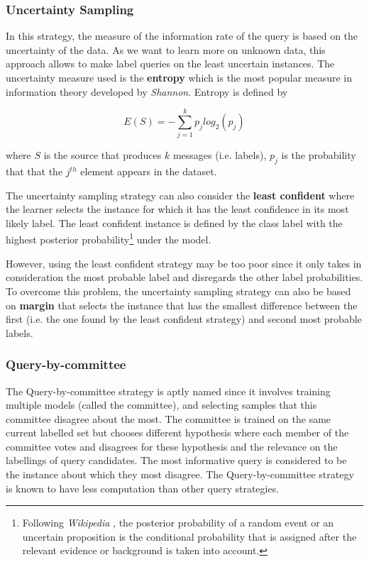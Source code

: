 \documentclass[11pt, openany]{report}
\theoremstyle{plain}
\theoremstyle{definition}
\theoremstyle{remark}
\begin{document}
\subsubsection{Uncertainty Sampling}
In this strategy, the measure of the information rate of the query is based on the uncertainty of   the data. As we want to learn more on unknown data, this approach allows to make label queries on the least uncertain instances. The uncertainty measure used is the \textbf{entropy} which is the most popular measure in information theory developed by \textit{Shannon}. Entropy is defined by

$$ E(S) = - \sum_{j=1}^{k} p_j log_{2}(p_j) $$ 

where $S$ is the source that produces $k$ messages (i.e. labels), $p_j$ is the probability that that the $j^{th}$ element appears in the dataset. 

The uncertainty sampling strategy can also consider the \textbf{least confident} where the learner selects the instance for which it has the least confidence in its most likely label. The least confident instance is defined by the class label with the highest posterior probability\footnote{Following \textit{Wikipedia} \cite{wiki}, the posterior probability of a random event or an uncertain proposition is the conditional probability that is assigned after the relevant evidence or background is taken into account.} under the model. 

However, using the least confident strategy may be too poor since it only takes in consideration the most probable label and disregards the other label probabilities. To overcome this problem, the uncertainty sampling strategy can also be based on \textbf{margin} that selects the instance that has the smallest difference between the first (i.e. the one found by the least confident strategy) and second most probable labels. 


\subsubsection{Query-by-committee}
The Query-by-committee strategy is aptly named since it involves training multiple models (called the committee), and selecting samples that this committee disagree about the most. The committee is trained on the same current labelled set but chooses different hypothesis where each member of the committee votes and disagrees for these hypothesis and the relevance on the labellings of query candidates.  The most informative query is considered to be the instance about which they most disagree. The Query-by-committee strategy is known to have less computation than other query strategies.
\end{document}
